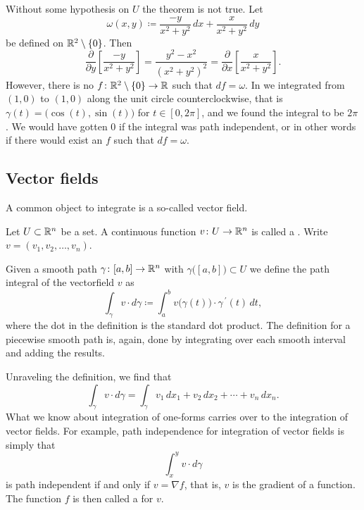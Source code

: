 \begin{example}
Without some hypothesis on $U$ the theorem is not true.  Let
\begin{equation*}
\omega(x,y) \coloneqq \frac{-y}{x^2+y^2} \,dx + \frac{x}{x^2+y^2} \,dy
\end{equation*}
be defined on ${\mathbb{R}}^2 \setminus \{ 0 \}$.  Then
\begin{equation*}
\frac{\partial}{\partial y} \left[ 
\frac{-y}{x^2+y^2} \right] =
\frac{y^2-x^2}{{(x^2+y^2)}^2}
=
\frac{\partial}{\partial x} \left[ 
\frac{x}{x^2+y^2} \right] .
\end{equation*}
However, there is no $f \colon {\mathbb{R}}^2 \setminus \{ 0 \} \to {\mathbb{R}}$ such that 
$df = \omega$.  In
 we integrated from $(1,0)$ to $(1,0)$
along the unit circle counterclockwise,
that is $\gamma(t) = \bigl(\cos(t),\sin(t)\bigr)$
for $t \in [0,2\pi]$, and we found the integral to be $2\pi$.  We would have
gotten $0$ if
the integral was path independent,
or in other words if there would exist an $f$ such that
$df = \omega$.
\end{example}

\subsection{Vector fields}

A common object to integrate is a so-called vector field.

\begin{defn}
Let $U \subset {\mathbb{R}}^n$ be a set.
A continuous function $v \colon U \to {\mathbb{R}}^n$ is called a
\emph{}.  Write $v = (v_1,v_2,\ldots,v_n)$.

Given a smooth path $\gamma \colon [a,b] \to {\mathbb{R}}^n$ with
$\gamma\bigl([a,b]\bigr) \subset U$ we define
the path integral of the vectorfield $v$ as
\begin{equation*}
\int_{\gamma} v \cdot d\gamma
\coloneqq
\int_a^b v\bigl(\gamma(t)\bigr) \cdot \gamma^{\:\prime}(t) \, dt ,
\end{equation*}
where the dot in the definition is the standard dot product.
The definition for a piecewise smooth path is, again, done by integrating over
each smooth interval and adding the results.
\end{defn}

Unraveling the definition, we find that
\begin{equation*}
\int_{\gamma} v \cdot d\gamma
=
\int_{\gamma} v_1 \,dx_1 + v_2 \,dx_2 + \cdots + v_n \,dx_n .
\end{equation*}
What we know about integration of
one-forms carries over to the integration of vector fields.
For example, path independence for integration of vector fields is simply
that
\begin{equation*}
\int_x^y v \cdot d\gamma
\end{equation*}
is path independent if and only if 
$v = \nabla f$, that is, $v$ is the gradient of a function.  The function $f$
is then called a \emph{} for $v$.

